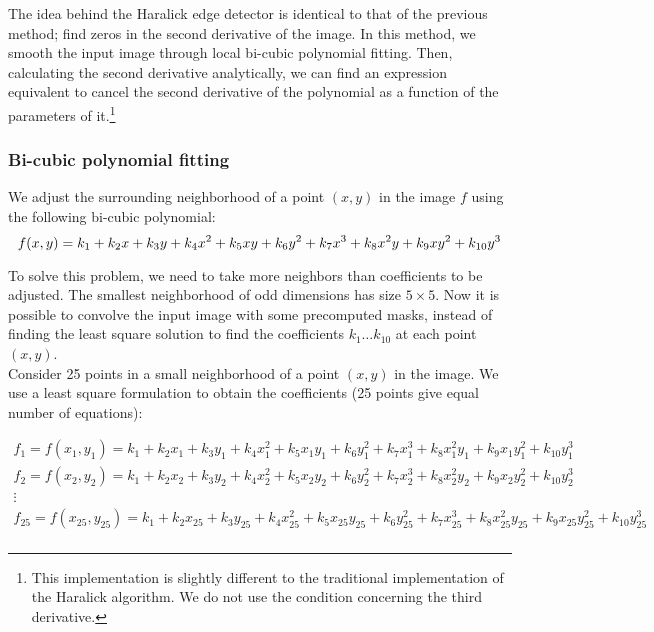 \documentclass{ipol}
\numberwithin{equation}{section}
\numberwithin{table}{section}
\begin{document}
The idea behind the Haralick edge detector is identical to that of the previous method; find zeros in 
the second derivative of the image. In this method, we smooth the input image through local bi-cubic
polynomial fitting. Then, calculating the second derivative analytically, we can find an expression 
equivalent to cancel the second derivative of the polynomial as a function of the parameters of it.\footnote{This implementation is slightly 
different to the traditional implementation of the Haralick algorithm. We do not use the condition concerning the third derivative.}\\

\subsubsection{Bi-cubic polynomial fitting}
\label{sec:bicubic}

We adjust the surrounding neighborhood of a point $(x,y)$ in the image $f$ using the following bi-cubic polynomial:
\begin{equation}
	\label{eq:bicubic}
	f(x,y) = k_1 + k_2x + k_3y + k_4x^2 + k_5xy + k_6y^2 + k_7x^3 + k_8x^2y + k_9xy^2 + k_{10}y^3\\
\end{equation}

To solve this problem, we need to take more neighbors than coefficients to be adjusted. The smallest 
neighborhood of odd dimensions has size $5\times5$. Now it is possible to convolve the input image
with some precomputed masks, instead of finding the least square solution to find the coefficients 
$k_1\dots k_{10}$ at each point $(x,y)$.\\

Consider 25 points in a small neighborhood of a point $(x,y)$ in the image. We use a least square
formulation to obtain the coefficients (25 points give equal number of equations):

\begin{equation*}
	\begin{array}{l}
		f_1 = f(x_1,y_1) = k_1 + k_2x_1 + k_3y_1 + k_4x_1^2 + k_5x_1y_1 + k_6y_1^2 + k_7x_1^3 + k_8x_1^2y_1 + k_9x_1y_1^2 + k_{10}y_1^3\\
		f_2 = f(x_2,y_2) = k_1 + k_2x_2 + k_3y_2 + k_4x_2^2 + k_5x_2y_2 + k_6y_2^2 + k_7x_2^3 + k_8x_2^2y_2 + k_9x_2y_2^2 + k_{10}y_2^3\\
		\vdots \\
		f_{25} = f(x_{25},y_{25}) = k_1 + k_2x_{25} + k_3y_{25} + k_4x_{25}^2 + k_5x_{25}y_{25} + k_6y_{25}^2 + k_7x_{25}^3 + k_8x_{25}^2y_{25} + k_9x_{25}y_{25}^2 + k_{10}y_{25}^3\\
	\end{array}
\end{equation*}
\end{document}
